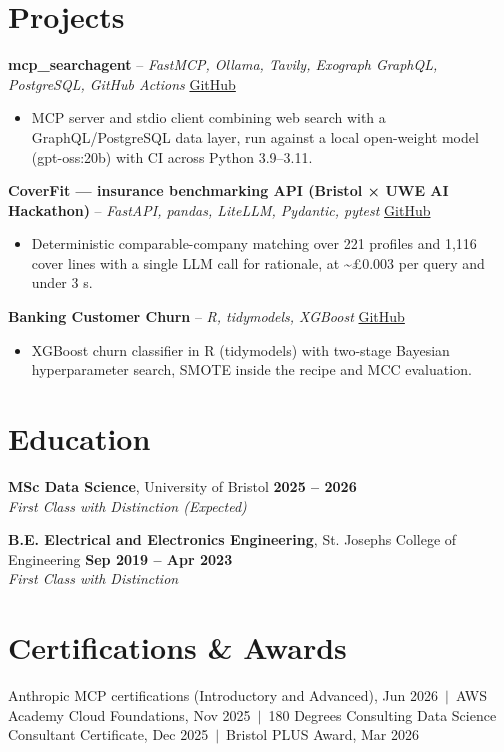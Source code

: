 \documentclass[a4paper,11pt]{article}
\begin{document}
\section{Projects}
\noindent\textbf{mcp\_searchagent} -- \textit{FastMCP, Ollama, Tavily, Exograph GraphQL, PostgreSQL, GitHub Actions} \hfill \href{https://github.com/Thiruvel-AP/mcp_searchagent}{GitHub}
\begin{itemize}
  \item MCP server and stdio client combining web search with a GraphQL/PostgreSQL data layer, run against a local open-weight model (gpt-oss:20b) with CI across Python 3.9–3.11.
\end{itemize}
\vspace{3pt}
\noindent\textbf{CoverFit — insurance benchmarking API (Bristol × UWE AI Hackathon)} -- \textit{FastAPI, pandas, LiteLLM, Pydantic, pytest} \hfill \href{https://github.com/Thiruvel-AP/AIHackathon-Phoenix}{GitHub}
\begin{itemize}
  \item Deterministic comparable-company matching over 221 profiles and 1,116 cover lines with a single LLM call for rationale, at \textasciitilde{}£0.003 per query and under 3 s.
\end{itemize}
\vspace{3pt}
\noindent\textbf{Banking Customer Churn} -- \textit{R, tidymodels, XGBoost} \hfill \href{https://github.com/Thiruvel-AP/Banking-Customer-Churn-Prediction}{GitHub}
\begin{itemize}
  \item XGBoost churn classifier in R (tidymodels) with two-stage Bayesian hyperparameter search, SMOTE inside the recipe and MCC evaluation.
\end{itemize}

\section{Education}
\textbf{MSc Data Science}, University of Bristol \hfill \textbf{2025 – 2026}\\ \textit{First Class with Distinction (Expected)}\par
\vspace{3pt}
\textbf{B.E. Electrical and Electronics Engineering}, St. Joseph\textquotesingle{}s College of Engineering \hfill \textbf{Sep 2019 – Apr 2023}\\ \textit{First Class with Distinction}\par

\section{Certifications \& Awards}
Anthropic MCP certifications (Introductory and Advanced), Jun 2026 \,$|$\, AWS Academy Cloud Foundations, Nov 2025 \,$|$\, 180 Degrees Consulting Data Science Consultant Certificate, Dec 2025 \,$|$\, Bristol PLUS Award, Mar 2026
\end{document}
